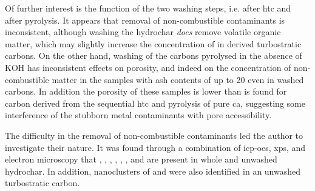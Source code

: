 Of further interest is the function of the two washing steps, i.e. after \gls{htc} and after pyrolysis. It appears that removal of non-combustible contaminants is inconsistent, although washing the \gls{hydrochar} \textit{does} remove volatile organic matter, which may slightly increase the concentration of  in derived turbostratic carbons. On the other hand, washing of the carbons pyrolysed in the absence of KOH has inconsistent effects on porosity, and indeed on the concentration of non-combustible matter in the samples with \glspl{ash content} of up to \qty{20}{\wtpercent} even in washed carbons. In addition the porosity of these samples is lower than is found for carbon derived from the sequential \gls{htc} and pyrolysis of pure \acrshort{ca}, suggesting some interference of the stubborn metal contaminants with pore accessibility.

The difficulty in the removal of non-combustible contaminants led the author to investigate their nature. It was found through a combination of \acrshort{icp-oes}, \acrshort{xps}, and electron microscopy that , , , , , , and  are present in whole  and unwashed \gls{hydrochar}. In addition, nanoclusters of  and  were also identified in an unwashed \gls{turbostratic carbon}. 




